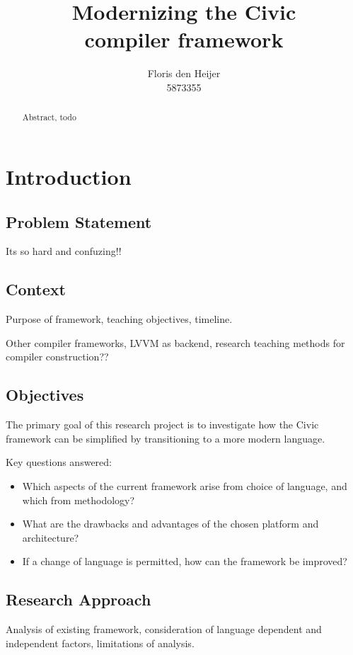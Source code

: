 \documentclass[twoside,openright]{uva-bachelor-thesis}
\title{Modernizing the Civic \\compiler framework}
\author{Floris den Heijer\\5873355}
\begin{document}
\maketitle
\begin{abstract}
	Abstract, todo
\end{abstract}

\tableofcontents

\chapter{Introduction}
	\section{Problem Statement}
		Its so hard and confuzing!! \cite{unknown}
			
	\section{Context}
		Purpose of framework, teaching objectives, timeline.
	
		Other compiler frameworks, LVVM as backend, research teaching methods for compiler construction??
	
	\section{Objectives}
		The primary goal of this research project is to investigate how the Civic framework can be simplified by transitioning to a more modern language.
		
		Key questions answered:
		\begin{itemize}
			\item Which aspects of the current framework arise from choice of language, and which from methodology?
			\item What are the drawbacks and advantages of the chosen platform and architecture?
			\item If a change of language is permitted, how can the framework be improved?
		\end{itemize}
	
	\section{Research Approach}
		Analysis of existing framework, consideration of language dependent and independent factors, limitations of analysis.
	
\end{document}
